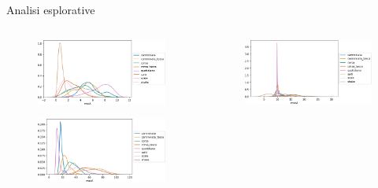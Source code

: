 \documentclass{beamer}
\begin{document}
\begin{frame}{Analisi esplorative}
\begin{columns}[T] %
\begin{column}{.33\textwidth}
\begin{figure}[H]
\includegraphics[width=\textwidth]{../figure/minA.png}
\end{figure}
\begin{figure}[H]
\includegraphics[width=\textwidth]{../figure/maxA.png}
\end{figure}
\end{column}%
\hfill%
\begin{column}{.33\textwidth}
\begin{figure}[H]
\includegraphics[width=\textwidth]{../figure/medA.png}

\end{figure}
\end{column}
\end{columns}
\end{frame}
\end{document}
